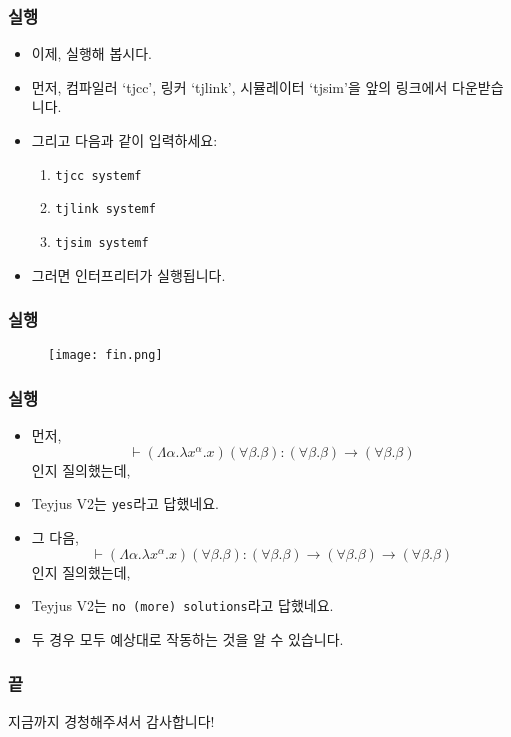 \documentclass[slidestop,compress,mathserif]{beamer}
\begin{document}
    \begin{frame}
        \frametitle{실행}
        \begin{itemize}
            \item 이제, 실행해 봅시다.
            \item 먼저, 컴파일러 `tjcc', 링커 `tjlink', 시뮬레이터 `tjsim'을 앞의 링크에서 다운받습니다.
            \item 그리고 다음과 같이 입력하세요:
            \begin{enumerate}
                \item \texttt{tjcc systemf}
                \item \texttt{tjlink systemf}
                \item \texttt{tjsim systemf}
            \end{enumerate}
            \item 그러면 인터프리터가 실행됩니다.
        \end{itemize}
    \end{frame}

    \begin{frame}
        \frametitle{실행}
        \begin{figure}[h]
            \begin{center}
                \texttt{[image: fin.png]}
            \end{center}
        \end{figure}
    \end{frame}

    \begin{frame}
        \frametitle{실행}
        \begin{itemize}
            \item 먼저, $$\vdash \left( \Lambda \alpha . \lambda x^{\alpha} . x \right) \left( \forall \beta . \beta \right) : \left( \forall \beta . \beta \right) \to \left( \forall \beta . \beta \right)$$인지 질의했는데,
            \item Teyjus V2는 \texttt{yes}라고 답했네요.
            \item 그 다음, $$\vdash \left( \Lambda \alpha . \lambda x^{\alpha} . x \right) \left( \forall \beta . \beta \right) : \left( \forall \beta . \beta \right) \to \left( \forall \beta . \beta \right) \to \left( \forall \beta . \beta \right)$$인지 질의했는데,
            \item Teyjus V2는 \texttt{no (more) solutions}라고 답했네요.
            \item 두 경우 모두 예상대로 작동하는 것을 알 수 있습니다.
        \end{itemize}
    \end{frame}

    \begin{frame}[c]
        \frametitle{끝}
        \centering
        지금까지 경청해주셔서 감사합니다!
    \end{frame}
\end{document}
